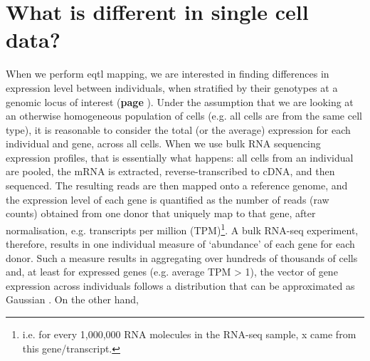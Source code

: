 \newpage

\section{What is different in single cell data?}

When we perform \gls{eqtl} mapping, we are interested in finding differences in expression level between individuals, when stratified by their genotypes at a genomic locus of interest (\textbf{page 
\pageref{fig:eqtl}}). 
Under the assumption that we are looking at an otherwise homogeneous population of cells (e.g. all cells are from the same cell type), it is reasonable to consider the total (or the average) expression for each individual and gene, across all cells.
When we use bulk RNA sequencing expression profiles, that is essentially what happens: all cells from an individual are pooled, the mRNA is extracted, reverse-transcribed to cDNA, and then sequenced. 
The resulting reads are then mapped onto a reference genome, and the expression level of each gene is quantified as the number of reads (raw counts) obtained from one donor that uniquely map to that gene, after normalisation, e.g. transcripts per million (TPM)\footnote{i.e. for every 1,000,000 RNA molecules in the RNA-seq sample, x came from this gene/transcript.}. 
A bulk RNA-seq experiment, therefore, results in one individual measure of `abundance' of each gene for each donor. 
Such a measure results in 
aggregating over 
hundreds of thousands of cells
and, at least for expressed genes (e.g. average TPM > 1), the vector of gene expression across individuals follows a distribution that can be approximated as Gaussian \cite{piras2015reduction}.
On the other hand,
